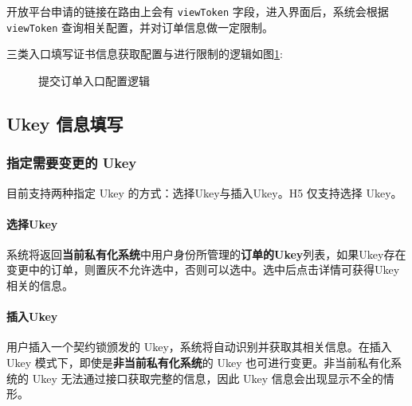 开放平台申请的链接在路由上会有 \texttt{viewToken} 字段，进入界面后，系统会根据 \texttt{viewToken} 查询相关配置，并对订单信息做一定限制。

三类入口填写证书信息获取配置与进行限制的逻辑如图\ref{fig:提交订单入口配置逻辑}:
\begin{figure}[H]
  \small
  \centering
  \caption{提交订单入口配置逻辑}
  \label{fig:提交订单入口配置逻辑}
\end{figure}

\subsection{Ukey 信息填写}

\subsubsection{指定需要变更的 Ukey}

目前支持两种指定 Ukey 的方式：选择Ukey与插入Ukey。H5 仅支持选择 Ukey。

\paragraph*{选择Ukey} 

系统将返回\textbf{当前私有化系统}中用户身份所管理的\textbf{订单的Ukey}列表，如果Ukey存在变更中的订单，则置灰不允许选中，否则可以选中。选中后点击详情可获得Ukey相关的信息。

\paragraph*{插入Ukey} 用户插入一个契约锁颁发的 Ukey，系统将自动识别并获取其相关信息。在插入 Ukey 模式下，即使是\textbf{非当前私有化系统}的 Ukey 也可进行变更。非当前私有化系统的 Ukey 无法通过接口获取完整的信息，因此 Ukey 信息会出现显示不全的情形。

